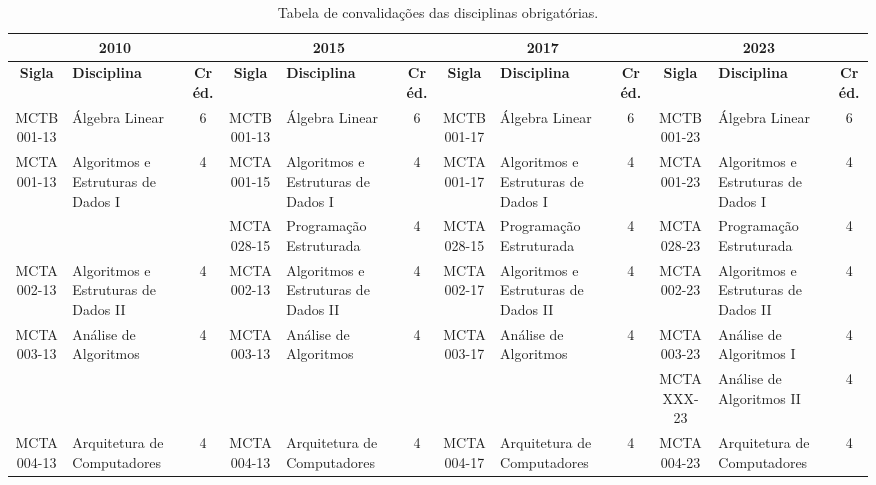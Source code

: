 \documentclass[a4paper]{article}
\begin{document}
\begin{landscape}
{\footnotesize
\begin{longtable}{|c|p{.2\textheight}|c||c|p{.2\textheight}|c||c|p{.2\textheight}|c||c|p{.2\textheight}|c|}
    \caption{Tabela de convalidações das disciplinas obrigatórias.}
    \label{tab:convalidacoes_obrigatorias} \\

    \hline
    \multicolumn{3}{|c||}{\bf 2010} & \multicolumn{3}{|c|}{\bf 2015} &
    \multicolumn{3}{|c||}{\bf 2017} & \multicolumn{3}{|c|}{\bf 2023} \\ 
    \hline
    
    \textbf{Sigla} & \textbf{Disciplina} & \textbf{Créd.} & \textbf{Sigla} & \textbf{Disciplina} & \textbf{Créd.} &
    \textbf{Sigla} & \textbf{Disciplina} & \textbf{Créd.} & \textbf{Sigla} & \textbf{Disciplina} & \textbf{Créd.} \\
    \hline\hline
    
    MCTB001-13 & Álgebra Linear & 6 &
    MCTB001-13 & Álgebra Linear & 6 &
    MCTB001-17 & Álgebra Linear & 6 &
    MCTB001-23 & Álgebra Linear & 6 \\ \hline

    MCTA001-13 & Algoritmos e Estruturas de Dados I & 4 &
    MCTA001-15 & Algoritmos e Estruturas de Dados I & 4 & 
    MCTA001-17 & Algoritmos e Estruturas de Dados I & 4 & 
    MCTA001-23 & Algoritmos e Estruturas de Dados I & 4 \\

    & & &
    MCTA028-15 & Programação Estruturada & 4 &
    MCTA028-15 & Programação Estruturada & 4 &
    MCTA028-23 & Programação Estruturada & 4 \\ \hline

    MCTA002-13 & Algoritmos e Estruturas de Dados II & 4 &
    MCTA002-13 & Algoritmos e Estruturas de Dados II & 4 & 
    MCTA002-17 & Algoritmos e Estruturas de Dados II & 4 & 
    MCTA002-23 & Algoritmos e Estruturas de Dados II & 4 \\ \hline

    MCTA003-13 & Análise de Algoritmos & 4 &
    MCTA003-13 & Análise de Algoritmos & 4 &
    MCTA003-17 & Análise de Algoritmos & 4 & 
    MCTA003-23 & Análise de Algoritmos I & 4 \\

    & & &
    & & &
    & & &
    MCTAXXX-23 & Análise de Algoritmos II & 4 \\ \hline

    MCTA004-13 & Arquitetura de Computadores & 4 &
    MCTA004-13 & Arquitetura de Computadores & 4 &
    MCTA004-17 & Arquitetura de Computadores & 4 &
    MCTA004-23 & Arquitetura de Computadores & 4 \\ \hline


\end{longtable}}
\end{landscape}
\end{document}
